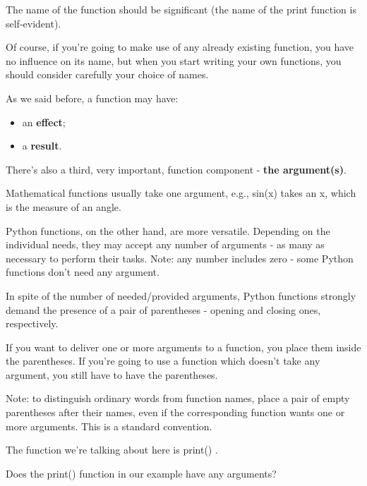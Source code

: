 \documentclass[a4paper,10pt]{article}
\begin{document}
The name of the function should be significant (the name of the print function is self-evident).
\newline

Of course, if you're going to make use of any already existing function, you have no influence on its name, but when you start writing your own functions, you should consider carefully your choice of names.
\newline

As we said before, a function may have:
\begin{itemize}
 \item an \textbf{effect};
 \item a \textbf{result}.
\end{itemize}

There's also a third, very important, function component - \textbf{the argument(s)}.
\newline

Mathematical functions usually take one argument, e.g., sin(x) takes an x, which is the measure of an angle.
\newline

Python functions, on the other hand, are more versatile. Depending on the individual needs, they may accept any number of arguments - as many as necessary to perform their tasks. Note: any number includes zero - some Python functions don't need any argument.
\newline

In spite of the number of needed/provided arguments, Python functions strongly demand the presence of a pair of parentheses - opening and closing ones, respectively.
\newline

If you want to deliver one or more arguments to a function, you place them inside the parentheses. If you're going to use a function which doesn't take any argument, you still have to have the parentheses.
\newline

Note: to distinguish ordinary words from function names, place a pair of empty parentheses after their names, even if the corresponding function wants one or more arguments. This is a standard convention.
\newline

The function we're talking about here is {\selectfont print() }.
\newline

Does the {\selectfont print() }function in our example have any arguments?
\newline
\end{document}
